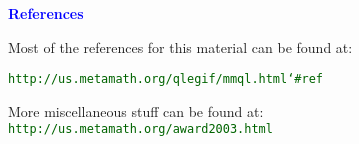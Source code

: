 \documentclass{slides}
\begin{document}
\begin{slide}

\begin{center}
\textcolor{blue}{\textbf{References}}

Most of the references for this material can be found at:

\textcolor{darkgreen}{
\texttt{http://us.metamath.org/qlegif/mmql.html{\char`\#}ref}}

\vspace{3ex}

More miscellaneous stuff can be found at:\\
\textcolor{darkgreen}{
\texttt{http://us.metamath.org/award2003.html}}

\end{center}
\end{slide}
\end{document}
